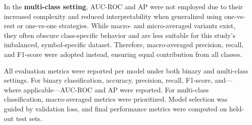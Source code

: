 In the \textbf{multi-class setting}, \ac{AUC-ROC} and \ac{AP} were not employed due to their increased complexity and
reduced interpretability when generalized using one-vs-rest or one-vs-one strategies. While macro- and
micro-averaged variants exist, they often obscure class-specific behavior and are less suitable for this study's
imbalanced, symbol-specific dataset. Therefore, macro-averaged precision, recall, and F1-score were adopted instead,
ensuring equal contribution from all classes.

All evaluation metrics were reported per model under both binary and multi-class settings. For binary
classification, accuracy, precision, recall, F1-score, and—where applicable—\ac{AUC-ROC} and \ac{AP} were reported. For
multi-class classification, macro-averaged metrics were prioritized. Model selection was guided by validation loss,
and final performance metrics were computed on held-out test sets.
